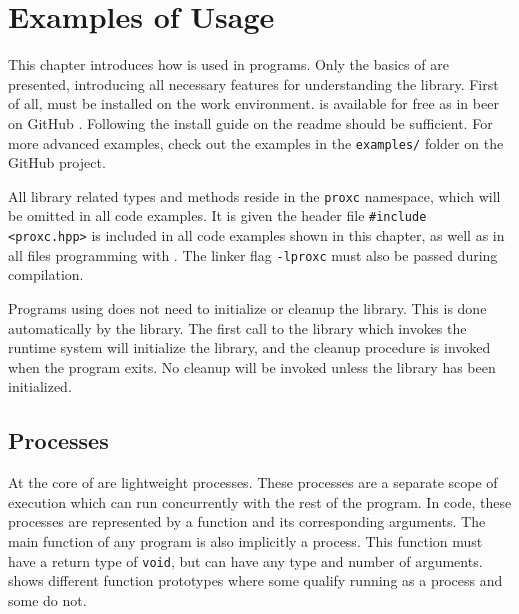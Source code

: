 

\chapter{Examples of Usage}
\label{ch:examples_usage}

This chapter introduces how \Proxc{} is used in \Cpp{} programs. Only the basics of \Proxc{} are presented, introducing all necessary features for understanding the library. First of all, \Proxc{} must be installed on the work environment. \Proxc{} is available for free as in beer on GitHub \citep{pettersen2017proxcgithub}. Following the install guide on the readme should be sufficient. For more advanced examples, check out the examples in the \texttt{examples/} folder on the GitHub project.

All library related types and methods reside in the \lstinline[style={CustomC++}]|proxc| namespace, which will be omitted in all code examples. It is given the header file \lstinline[style={CustomC++}]|#include <proxc.hpp>| is included in all code examples shown in this chapter, as well as in all \Cpp{} files programming with \Proxc. The linker flag \lstinline[style={CustomC++}]|-lproxc| must also be passed during compilation.

Programs using \Proxc{} does not need to initialize or cleanup the library. This is done automatically by the library. The first call to the library which invokes the runtime system will initialize the library, and the cleanup procedure is invoked when the program exits. No cleanup will be invoked unless the library has been initialized. 


\section{Processes}


At the core of \Proxc{} are lightweight processes. These processes are a separate scope of execution which can run concurrently with the rest of the program. In code, these processes are represented by a function and its corresponding arguments. The main function of any \Cpp{} program is also implicitly a process. This function must have a return type of \lstinline[style={CustomC++}]|void|, but can have any type and number of arguments.  shows different function prototypes where some qualify running as a process and some do not.

